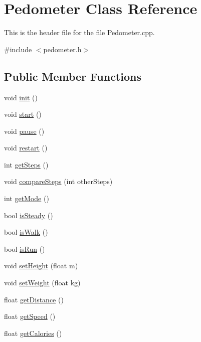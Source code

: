 \hypertarget{classPedometer}{\section{Pedometer Class Reference}
\label{classPedometer}
}


This is the header file for the file Pedometer.\+cpp.  




{\ttfamily \#include $<$pedometer.\+h$>$}

\subsection*{Public Member Functions}
\begin{DoxyCompactItemize}
\item 
void \hyperlink{classPedometer_a8f0c7938e375751d3d34fdcb6c4880c6}{init} ()
\item 
void \hyperlink{classPedometer_a6ba723efbe52177d23c41aa63d4f55d1}{start} ()
\item 
void \hyperlink{classPedometer_a81c83bde8af270c3596ffc08f256cf65}{pause} ()
\item 
void \hyperlink{classPedometer_ae9beddf74190d07ff611e21a9c490faa}{restart} ()
\item 
int \hyperlink{classPedometer_a4d48e84820e8c2448d5147d1c7e2693a}{get\+Steps} ()
\item 
void \hyperlink{classPedometer_a5a9e12150df12ad8e5706c09ceac6a51}{compare\+Steps} (int other\+Steps)
\item 
int \hyperlink{classPedometer_a854089e4420736acb78b25d9ca037084}{get\+Mode} ()
\item 
bool \hyperlink{classPedometer_ab1a681e46f1f0a157cf5cf2ebff5b609}{is\+Steady} ()
\item 
bool \hyperlink{classPedometer_a1944eba109a4f2cd9d9948c0677627df}{is\+Walk} ()
\item 
bool \hyperlink{classPedometer_ab2cadd5ca49b6e3ce1f844603fcf3a08}{is\+Run} ()
\item 
void \hyperlink{classPedometer_a0f2085c2686f6acd824411a3cd75132f}{set\+Height} (float m)
\item 
void \hyperlink{classPedometer_a25dd27f55bf919dcd7e7db0fa2b0aa1f}{set\+Weight} (float kg)
\item 
float \hyperlink{classPedometer_a2120dca6727a59a76339ca2273841797}{get\+Distance} ()
\item 
float \hyperlink{classPedometer_a2e2ce2a5ddb05410aa7e2c1eb0746da0}{get\+Speed} ()
\item 
float \hyperlink{classPedometer_a6470da610c09e3ea71fa1b8a67351da1}{get\+Calories} ()
\end{DoxyCompactItemize}
